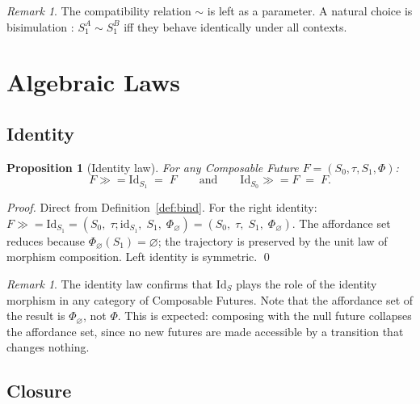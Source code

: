 \documentclass[11pt, a4paper]{article}
\theoremstyle{plain}
\newtheorem{proposition}[theorem]{Proposition}
\theoremstyle{definition}
\theoremstyle{remark}
\newtheorem{remark}[theorem]{Remark}
\newcommand{\bind}{\mathbin{\gg\!=}}          %
\newcommand{\nullfut}{\mathrm{Id}}             %
\newcommand{\Szero}{S_0}                       %
\newcommand{\Sone}{S_1}                        %
\newcommand{\traj}{\tau}                       %
\newcommand{\aff}{\Phi}                        %
\begin{document}
\begin{remark}
The compatibility relation $\sim$ is left as a parameter.
A natural choice is bisimulation \parencite{milner1989communication}:
$\Sone^A \sim \Sone^B$ iff they behave identically under all contexts.
\end{remark}

\section{Algebraic Laws}
\label{sec:laws}

\subsection{Identity}

\begin{proposition}[Identity law]
\label{prop:identity}
For any Composable Future $F = (\Szero, \traj, \Sone, \aff)$:
\[
  F \bind \nullfut_{\Sone} \;=\; F
  \qquad\text{and}\qquad
  \nullfut_{\Szero} \bind F \;=\; F.
\]
\end{proposition}

\begin{proof}
Direct from Definition~\ref{def:bind}.
For the right identity:
$F \bind \nullfut_{\Sone}
  = (\Szero,\; \traj ; \mathrm{id}_{\Sone},\; \Sone,\; \aff_\varnothing)
  = (\Szero,\; \traj,\; \Sone,\; \aff_\varnothing)$.
The affordance set reduces because $\aff_\varnothing(\Sone) = \varnothing$;
the trajectory is preserved by the unit law of morphism composition.
Left identity is symmetric.
\qed
\end{proof}

\begin{remark}
The identity law confirms that $\nullfut_S$ plays the role of the identity
morphism in any category of Composable Futures.
Note that the affordance set of the result is $\aff_\varnothing$, not $\aff$.
This is expected: composing with the null future collapses the affordance
set, since no new futures are made accessible by a transition that changes
nothing.
\end{remark}

\subsection{Closure}
\end{document}
